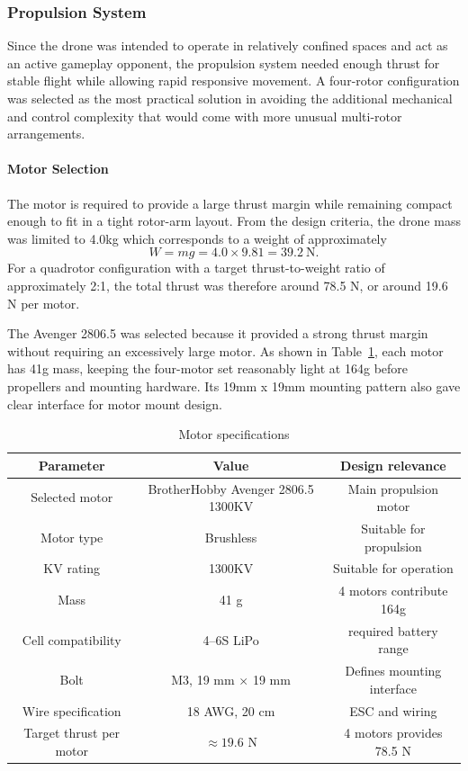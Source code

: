 \documentclass{report_template_oxford}
\begin{document}
\subsubsection{Propulsion System}
\label{sec:propulsion_system}

Since the drone was intended to operate in relatively confined spaces and act as an active gameplay opponent, the propulsion system needed enough thrust for stable flight while allowing rapid responsive movement. A four-rotor configuration was selected as the most practical solution in avoiding the additional mechanical and control complexity that would come with more unusual multi-rotor arrangements.

\paragraph{Motor Selection}

The motor is required to provide a large thrust margin while remaining compact enough to fit in a tight rotor-arm layout. From the design criteria, the drone mass was limited to 4.0kg which corresponds to a weight of approximately
\[
W = mg = 4.0 \times 9.81 = 39.2~\text{N}.
\]
For a quadrotor configuration with a target thrust-to-weight ratio of approximately 2:1, the total thrust was therefore around 78.5 N, or around 19.6 N per motor.

The Avenger 2806.5 was selected because it provided a strong thrust margin without requiring an excessively large motor. As shown in Table~\ref{tab:motor_specifications}, each motor has 41g mass, keeping the four-motor set reasonably light at 164g before propellers and mounting hardware. Its 19mm x 19mm mounting pattern also gave clear interface for motor mount design.

\begin{table}[h]
\centering
\caption[Motor specifications]{Motor specifications\footnotemark}
\label{tab:motor_specifications}
\begin{tabular}{|c|c|c|}
\hline
\textbf{Parameter} & \textbf{Value} & \textbf{Design relevance} \\
\hline
Selected motor & BrotherHobby Avenger 2806.5 1300KV & Main propulsion motor \\
\hline
Motor type & Brushless & Suitable for  propulsion \\
\hline
KV rating & 1300KV & Suitable for operation \\
\hline
Mass & 41 g & 4 motors contribute 164g \\
\hline
Cell compatibility & 4--6S LiPo & required battery range\\
\hline
Bolt & M3, 19 mm $\times$ 19 mm & Defines mounting interface \\
\hline
Wire specification & 18 AWG, 20 cm &  ESC and wiring  \\
\hline
Target thrust per motor & $\approx 19.6$ N & 4 motors provides 78.5 N \\
\hline
\end{tabular}
\end{table}
\end{document}
